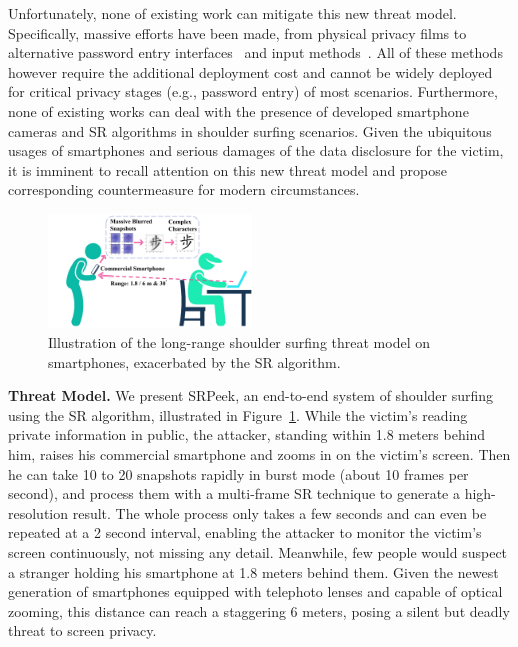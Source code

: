 
Unfortunately, none of existing work can mitigate this new threat model. Specifically, massive efforts have been made, from physical privacy films to alternative password entry interfaces~\cite{wiedenbeck2006design,papadopoulos2017illusionpin} and input methods~\cite{kumar2007reducing}. All of these methods however require the additional deployment cost \cite{Chun2019Keep} and cannot be widely deployed for critical privacy stages (e.g., password entry) of most scenarios. Furthermore, none of existing works can deal with the presence of developed smartphone cameras and SR algorithms in shoulder surfing scenarios. Given the ubiquitous usages of smartphones and serious damages of the data disclosure for the victim, it is imminent to recall attention on this new threat model and propose corresponding countermeasure for modern circumstances.

\begin{figure}
	\centering
	\includegraphics[width=0.48\textwidth]{pic/illustration.pdf}
    \caption{Illustration of the long-range shoulder surfing threat model on smartphones, exacerbated by the SR algorithm.}
	\label{illustration_of_system}
\end{figure}

\vspace{1mm}
\noindent
\textbf{Threat Model.} We present \textsf{SRPeek}, an end-to-end system of shoulder surfing using the SR algorithm, illustrated in Figure~\ref{illustration_of_system}. 
While the victim's reading private information in public, the attacker, standing within 1.8 meters behind him, raises his commercial smartphone and zooms in on the victim's screen. Then he can take 10 to 20 snapshots rapidly in burst mode (about 10 frames per second), and process them with a multi-frame SR technique to generate a high-resolution result. The whole process only takes a few seconds and can even be repeated at a 2 second interval, enabling the attacker to monitor the victim's screen continuously, not missing any detail. Meanwhile, few people would suspect a stranger holding his smartphone at 1.8 meters behind them. Given the newest generation of smartphones equipped with telephoto lenses and capable of optical zooming, this distance can reach a staggering 6 meters, posing a silent but deadly threat to screen privacy.


